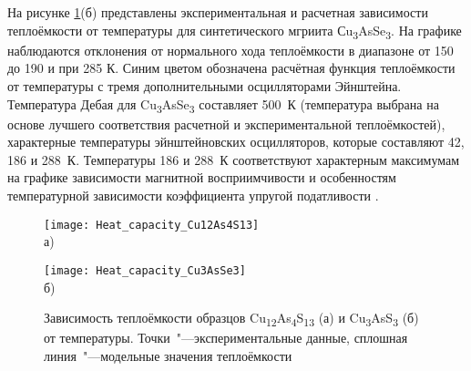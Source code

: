 На рисунке \ref{img:heat}(б) представлены экспериментальная и расчетная зависимости теплоёмкости от температуры для синтетического мгриита Сu\textsubscript{3}AsSe\textsubscript{3}. На графике наблюдаются отклонения от нормального хода теплоёмкости в диапазоне от 150 до 190 и при 285 К. Синим цветом обозначена расчётная функция теплоёмкости от температуры с тремя дополнительными осцилляторами Эйнштейна. Температура Дебая для Cu\textsubscript{3}AsSe\textsubscript{3} составляет 500~К (температура выбрана на основе лучшего соответствия расчетной  и экспериментальной  теплоёмкостей), характерные температуры эйнштейновских осцилляторов, которые составляют 42, 186 и 288~К.   Температуры 186 и 288~К соответствуют характерным максимумам на графике зависимости магнитной восприимчивости и  особенностям температурной зависимости коэффициента упругой податливости \cite{bab_81}.

\begin{figure}[p!]
  \begin{minipage}[ht]{0.9\linewidth}\centering
    \texttt{[image: Heat\_capacity\_Cu12As4S13]} \\ а)
  \end{minipage}
  \vfill
  \begin{minipage}[ht]{0.9\linewidth}\centering
    \texttt{[image: Heat\_capacity\_Cu3AsSe3]} \\ б)
  \end{minipage}

      \caption[Зависимость теплоёмкости образцов Cu\textsubscript{12}As\textsubscript{4}S\textsubscript{13} (а) и Cu\textsubscript{3}AsS\textsubscript{3} (б) от температуры. Точки~"---экспериментальные данные, сплошная линия~"---модельные значения теплоёмкости]{Зависимость теплоёмкости образцов Cu\textsubscript{12}As\textsubscript{4}S\textsubscript{13} (а) и Cu\textsubscript{3}AsS\textsubscript{3} (б) от температуры. Точки~"---экспериментальные данные, сплошная линия~"---модельные значения теплоёмкости}
    \label{img:heat}
\end{figure}


